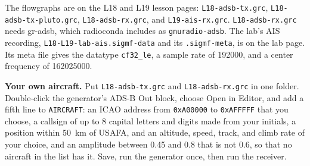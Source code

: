 \documentclass{exam}
\makeatletter
\def\keysol#1{\ifcsname keysol@#1\endcsname\csname keysol@#1\endcsname\fi}
\makeatother
\begin{document}
The flowgraphs are on the L18 and L19 lesson pages: \texttt{L18-adsb-tx.grc},
\texttt{L18-adsb-tx-pluto.grc}, \texttt{L18-adsb-rx.grc}, and \texttt{L19-ais-rx.grc}.
\texttt{L18-adsb-rx.grc} needs gr-adsb, which radioconda includes as \texttt{gnuradio-adsb}. The lab's AIS recording,
\texttt{L18-L19-lab-ais.sigmf-data} and its \texttt{.sigmf-meta}, is on the lab page.
Its meta file gives the datatype \texttt{cf32\_le}, a sample rate of 192000, and a
center frequency of 162025000.

\begin{questions}


\question \textbf{Your own aircraft.} Put \texttt{L18-adsb-tx.grc} and
\texttt{L18-adsb-rx.grc} in one folder. Double-click the generator's ADS-B Out block,
choose Open in Editor, and add a fifth line to \texttt{AIRCRAFT}: an ICAO address from
\texttt{0xA00000} to \texttt{0xAFFFFF} that you choose, a callsign of up to 8 capital
letters and digits made from your initials, a position within 50~km of USAFA, and an
altitude, speed, track, and climb rate of your choice, and an amplitude between 0.45
and 0.8 that is not 0.6, so that no aircraft in the list has it. Save, run the generator once, then run the receiver.



\end{questions}
\end{document}
